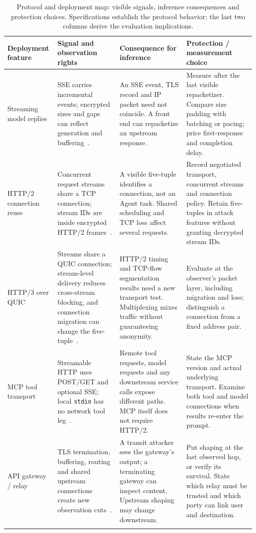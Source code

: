 \begin{table}[t]\centering\small
\caption{Protocol and deployment map: visible signals, inference consequences and protection choices. Specifications establish the protocol behavior; the last two columns derive the evaluation implications.}
\label{tab:deployment}
\setlength{\tabcolsep}{4pt}
\begin{tabularx}{\textwidth}{@{}P{.18\textwidth}P{.28\textwidth}P{.25\textwidth}Y@{}}\toprule
Deployment feature & Signal and observation rights & Consequence for inference & Protection / measurement choice \\\midrule
Streaming model replies & SSE carries incremental events; encrypted sizes and gaps can reflect generation and buffering~\cite{weiss2024prompt,whisperleak2025}. & An SSE event, TLS record and IP packet need not coincide. A front end can repacketize an upstream response. & Measure after the last visible repacketizer. Compare size padding with batching or pacing; price first-response and completion delay. \\\addlinespace[3pt]
HTTP/2 connection reuse & Concurrent request streams share a TCP connection; stream IDs are inside encrypted HTTP/2 frames~\cite{rfc9113}. & A visible five-tuple identifies a connection, not an Agent task. Shared scheduling and TCP loss affect several requests. & Record negotiated transport, concurrent streams and connection policy. Retain five-tuples in attack features without granting decrypted stream IDs. \\\addlinespace[3pt]
HTTP/3 over QUIC & Streams share a QUIC connection; stream-level delivery reduces cross-stream blocking, and connection migration can change the five-tuple~\cite{rfc9114,rfc9000}. & HTTP/2 timing and TCP-flow segmentation results need a new transport test. Multiplexing mixes traffic without guaranteeing anonymity. & Evaluate at the observer's packet layer, including migration and loss; distinguish a connection from a fixed address pair. \\\addlinespace[3pt]
MCP tool transport & Streamable HTTP uses POST/GET and optional SSE; local \texttt{stdio} has no network tool leg~\cite{mcp2025transports}. & Remote tool requests, model requests and any downstream service calls expose different paths. MCP itself does not require HTTP/2. & State the MCP version and actual underlying transport. Examine both tool and model connections when results re-enter the prompt. \\\addlinespace[3pt]
API gateway / relay & TLS termination, buffering, routing and shared upstream connections create new observation cuts~\cite{weiss2024prompt,dangol2026workflow}. & A transit attacker sees the gateway's output; a terminating gateway can inspect content. Upstream shaping may change downstream. & Put shaping at the last observed hop, or verify its survival. State which relay must be trusted and which party can link user and destination. \\\addlinespace[3pt]

\end{tabularx}
\end{table}
